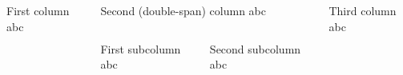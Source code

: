 \documentclass[final]{beamer}
\begin{document}
    \begin{frame}{}

        \begin{columns}[t]
            \begin{column}{.24\linewidth}
                \begin{block}{\large First column}
                    abc
                \end{block}
            \end{column}
            \begin{column}{.48\linewidth}
                \begin{block}{\large Second (double-span) column}
                    abc
                \end{block}
                \begin{columns}[t, totalwidth=\textwidth]
                    \begin{column}{.225\linewidth}
                        \begin{block}{\large First subcolumn}
                            abc
                        \end{block}
                    \end{column}
                    \begin{column}{.725\linewidth}
                        \begin{block}{\large Second subcolumn}
                            abc
                        \end{block}
                    \end{column}
                \end{columns}
            \end{column}
            \begin{column}{.24\linewidth}
                \begin{block}{\large Third column}
                    abc
                \end{block}
            \end{column}
        \end{columns}

    \end{frame}
\end{document}

